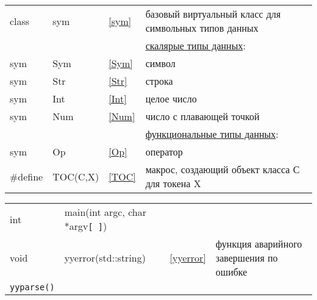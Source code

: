 
\begin{tabular}{l l l l}
class & sym & \ref{sym} &
базовый виртуальный класс для символьных типов данных \\
&&&\underline{скалярые типы данных}:\\
sym & Sym & \ref{Sym} & символ \\
sym & Str & \ref{Str} & строка \\
sym & Int & \ref{Int} & целое число \\
sym & Num & \ref{Num} & число с плавающей точкой \\
&&&\underline{функциональные типы данных}:\\
sym & Op & \ref{Op} & оператор \\
\#define & TOC(C,X) & \ref{TOC} & макрос, создающий объект класса С для токена X \\
\end{tabular}


\begin{tabular}{l l l l}
int & main(int argc, char *argv\verb|[ ]|) &&\\
void & yyerror(std::string) & \ref{yyerror} &
функция аварийного завершения по ошибке \\
\hline
\verb|yyparse()|\\
\end{tabular}


\secup




\secup
